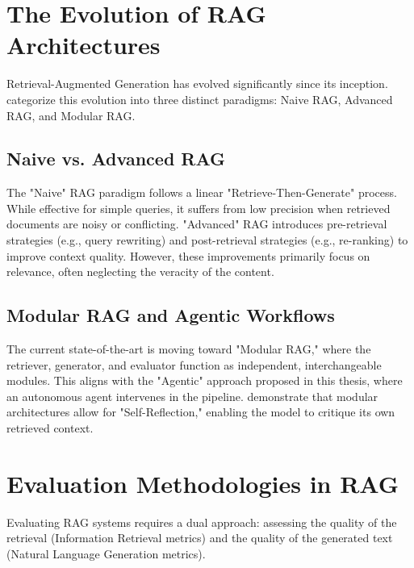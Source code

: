 \section{The Evolution of RAG Architectures}
\label{sec:lit_rag_evolution}

Retrieval-Augmented Generation has evolved significantly since its inception. \textcite{gao2024retrieval} categorize this evolution into three distinct paradigms: Naive RAG, Advanced RAG, and Modular RAG.

\subsection{Naive vs. Advanced RAG}
The "Naive" RAG paradigm follows a linear "Retrieve-Then-Generate" process. While effective for simple queries, it suffers from low precision when retrieved documents are noisy or conflicting. "Advanced" RAG introduces pre-retrieval strategies (e.g., query rewriting) and post-retrieval strategies (e.g., re-ranking) to improve context quality. However, these improvements primarily focus on relevance, often neglecting the veracity of the content.

\subsection{Modular RAG and Agentic Workflows}
The current state-of-the-art is moving toward "Modular RAG," where the retriever, generator, and evaluator function as independent, interchangeable modules. This aligns with the "Agentic" approach proposed in this thesis, where an autonomous agent intervenes in the pipeline. \textcite{asai2024selfrag} demonstrate that modular architectures allow for "Self-Reflection," enabling the model to critique its own retrieved context.

\section{Evaluation Methodologies in RAG}
\label{sec:lit_evaluation}

Evaluating RAG systems requires a dual approach: assessing the quality of the retrieval (Information Retrieval metrics) and the quality of the generated text (Natural Language Generation metrics).

